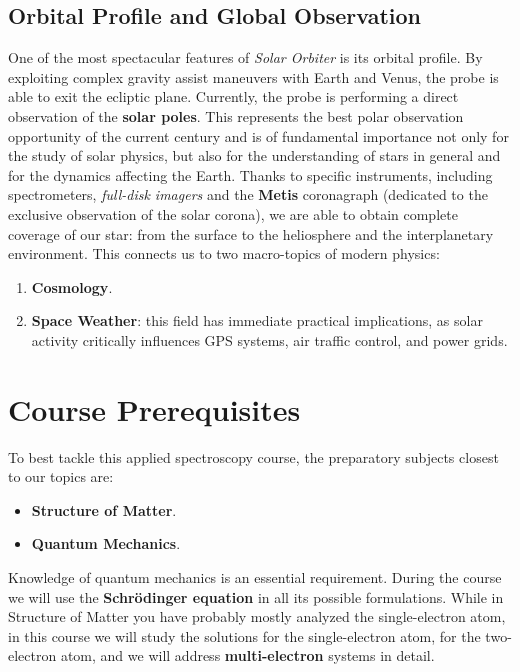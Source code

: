     \subsection{Orbital Profile and Global Observation}
    One of the most spectacular features of \textit{Solar Orbiter} is its orbital profile. By exploiting complex gravity assist maneuvers with Earth and Venus, the probe is able to exit the ecliptic plane. Currently, the probe is performing a direct observation of the \textbf{solar poles}. This represents the best polar observation opportunity of the current century and is of fundamental importance not only for the study of solar physics, but also for the understanding of stars in general and for the dynamics affecting the Earth. Thanks to specific instruments, including spectrometers, \textit{full-disk imagers} and the \textbf{Metis} coronagraph (dedicated to the exclusive observation of the solar corona), we are able to obtain complete coverage of our star: from the surface to the heliosphere and the interplanetary environment. This connects us to two macro-topics of modern physics:\begin{enumerate}\item \textbf{Cosmology}.\item \textbf{Space Weather}: this field has immediate practical implications, as solar activity critically influences GPS systems, air traffic control, and power grids.\end{enumerate}
    
\section{Course Prerequisites}
To best tackle this applied spectroscopy course, the preparatory subjects closest to our topics are:\begin{itemize}\item \textbf{Structure of Matter}.\item \textbf{Quantum Mechanics}.\end{itemize}Knowledge of quantum mechanics is an essential requirement. During the course we will use the \textbf{Schrödinger equation} in all its possible formulations. While in Structure of Matter you have probably mostly analyzed the single-electron atom, in this course we will study the solutions for the single-electron atom, for the two-electron atom, and we will address \textbf{multi-electron} systems in detail.


